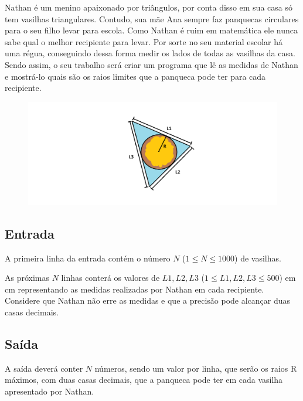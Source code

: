 Nathan é um menino apaixonado por triângulos, por conta disso em sua casa só tem vasilhas triangulares. Contudo, sua mãe Ana sempre faz panquecas circulares para o seu filho levar para escola. Como Nathan é ruim em matemática ele nunca sabe qual o melhor recipiente para levar. Por sorte no seu material escolar há uma régua, conseguindo dessa forma medir os lados de todas as vasilhas da casa. Sendo assim, o seu trabalho 
será criar um programa que lê as medidas de Nathan e mostrá-lo quais são os raios limites que a panqueca pode ter para cada recipiente. 

\begin{figure}[h!]
	\centering
 \includegraphics[scale=0.5]{vasilhaerrada.png}
\end{figure}

\subsection*{Entrada}
 
A primeira linha da entrada contém o número $N$ ($1\leq N\leq 1000$) de vasilhas.
 
As próximas $N$ linhas conterá os valores de $L1, L2, L3$ ($1\leq L1, L2, L3 \leq 500$) em cm representando as medidas realizadas por Nathan em cada recipiente. Considere que Nathan não erre as medidas e que a precisão pode alcançar duas casas decimais.
 
\subsection*{Saída}
A saída deverá conter $N$ números, sendo um valor por linha, que serão os raios R máximos, com duas casas decimais, que a panqueca pode ter em cada vasilha apresentado por Nathan.

